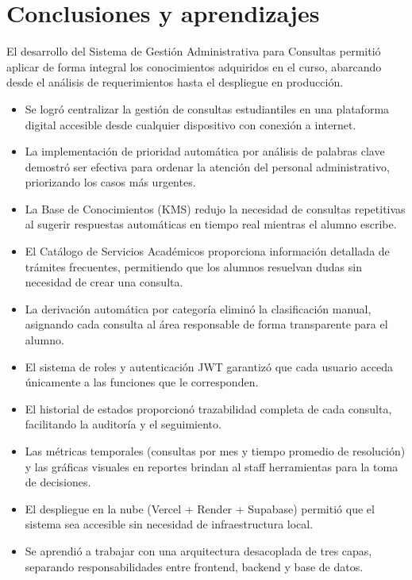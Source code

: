 \documentclass[12pt,a4paper]{article}
\begin{document}
	\newpage

	\section{Conclusiones y aprendizajes}

	El desarrollo del Sistema de Gestión Administrativa para Consultas permitió aplicar de forma integral los conocimientos adquiridos en el curso, abarcando desde el análisis de requerimientos hasta el despliegue en producción.

	\begin{itemize}
	\setlength{\itemindent}{1cm}
	\item Se logró centralizar la gestión de consultas estudiantiles en una plataforma digital accesible desde cualquier dispositivo con conexión a internet.
	\item La implementación de prioridad automática por análisis de palabras clave demostró ser efectiva para ordenar la atención del personal administrativo, priorizando los casos más urgentes.
	\item La Base de Conocimientos (KMS) redujo la necesidad de consultas repetitivas al sugerir respuestas automáticas en tiempo real mientras el alumno escribe.
	\item El Catálogo de Servicios Académicos proporciona información detallada de trámites frecuentes, permitiendo que los alumnos resuelvan dudas sin necesidad de crear una consulta.
	\item La derivación automática por categoría eliminó la clasificación manual, asignando cada consulta al área responsable de forma transparente para el alumno.
	\item El sistema de roles y autenticación JWT garantizó que cada usuario acceda únicamente a las funciones que le corresponden.
	\item El historial de estados proporcionó trazabilidad completa de cada consulta, facilitando la auditoría y el seguimiento.
	\item Las métricas temporales (consultas por mes y tiempo promedio de resolución) y las gráficas visuales en reportes brindan al staff herramientas para la toma de decisiones.
	\item El despliegue en la nube (Vercel + Render + Supabase) permitió que el sistema sea accesible sin necesidad de infraestructura local.
	\item Se aprendió a trabajar con una arquitectura desacoplada de tres capas, separando responsabilidades entre frontend, backend y base de datos.
	\end{itemize}
\end{document}
